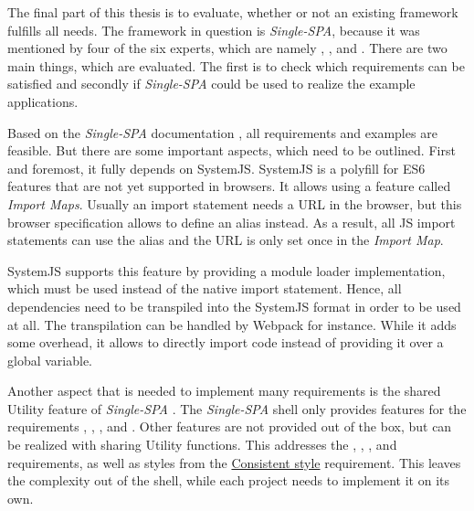 The final part of this thesis is to evaluate, whether or not an existing framework fulfills all needs.
The framework in question is \textit{Single-SPA}, because it was mentioned by four of the six experts, which are namely \textciteRehm{}, \textciteMezzalira{}, \textciteJovanovic{} and \textciteSteyer{}.
There are two main things, which are evaluated.
The first is to check which requirements can be satisfied and secondly if \textit{Single-SPA} could be used to realize the example applications.

Based on the \textit{Single-SPA} documentation \cite{singlespa.2020}, all requirements and examples are feasible.
But there are some important aspects, which need to be outlined.
First and foremost, it fully depends on SystemJS.
SystemJS is a polyfill for \ac{ES}6 features that are not yet supported in browsers\footnotemark.
It allows using a feature called \textit{Import Maps}.
Usually an import statement needs a \ac{URL} in the browser, but this browser specification allows to define an alias instead.
As a result, all \ac{JS} import statements can use the alias and the \ac{URL} is only set once in the \textit{Import Map}\footnotemark.

SystemJS supports this feature by providing a module loader implementation, which must be used instead of the native import statement.
Hence, all dependencies need to be transpiled into the SystemJS format in order to be used at all.
The transpilation can be handled by Webpack for instance.
While it adds some overhead, it allows to directly import code instead of providing it over a global variable.

Another aspect that is needed to implement many requirements is the shared Utility feature of \textit{Single-SPA} \cite{singlespa.2020}.
The \textit{Single-SPA} shell only provides features for the requirements , , ,  and .
Other features are not provided out of the box, but can be realized with sharing Utility functions.
This addresses the , , ,   and  requirements, as well as styles from the \hyperref[cha:requirement_detail_style]{Consistent style} requirement.
This leaves the complexity out of the shell, while each project needs to implement it on its own.

